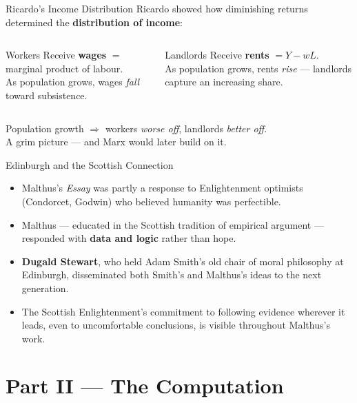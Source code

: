 \documentclass[aspectratio=169, 10pt]{beamer}
\begin{document}
\begin{frame}{Ricardo's Income Distribution}
Ricardo showed how diminishing returns determined the
\textbf{distribution of income}:
\vspace{0.5em}
\begin{columns}[T]
\begin{block}{Workers}
  Receive \textbf{wages} $= $ marginal product of labour.\\
  As population grows, wages \textit{fall} toward subsistence.
\end{block}
\begin{block}{Landlords}
  Receive \textbf{rents} $= Y - wL$.\\
  As population grows, rents \textit{rise} --- landlords capture
  an increasing share.
\end{block}
\end{columns}
\vspace{1em}
\begin{center}
Population growth $\Rightarrow$ workers \textit{worse off},
landlords \textit{better off}.\\[4pt]
A grim picture --- and Marx would later build on it.
\end{center}
\end{frame}

\begin{frame}{Edinburgh and the Scottish Connection}
\begin{itemize}
  \item Malthus's \textit{Essay} was partly a response to Enlightenment optimists
        (Condorcet, Godwin) who believed humanity was perfectible.
  \item Malthus --- educated in the Scottish tradition of empirical argument ---
        responded with \textbf{data and logic} rather than hope.
  \item \textbf{Dugald Stewart}, who held Adam Smith's old chair
        of moral philosophy at Edinburgh, disseminated both Smith's
        and Malthus's ideas to the next generation.
  \item The Scottish Enlightenment's commitment to
        \alert{following evidence wherever it leads}, even to uncomfortable
        conclusions, is visible throughout Malthus's work.
\end{itemize}
\end{frame}

\section{Part II --- The Computation}
\end{document}

